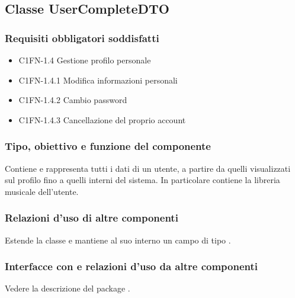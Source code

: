 \subsection{Classe UserCompleteDTO}
\subsubsection*{Requisiti obbligatori soddisfatti}
\begin{itemize}
	\item C1FN-1.4 Gestione profilo personale
	\item C1FN-1.4.1 Modifica informazioni personali
	\item C1FN-1.4.2 Cambio password
	\item C1FN-1.4.3 Cancellazione del proprio account
\end{itemize}
\subsubsection*{Tipo, obiettivo e funzione del componente}
Contiene e rappresenta tutti i dati di un utente, a partire da quelli
visualizzati sul profilo fino a quelli interni del sistema. In particolare
contiene la libreria musicale dell'utente. 
\subsubsection*{Relazioni d'uso di
altre componenti} Estende la classe  e mantiene al suo interno un campo di tipo
. 
\subsubsection*{Interfacce con e relazioni d'uso da altre
componenti} Vedere la descrizione del package .
